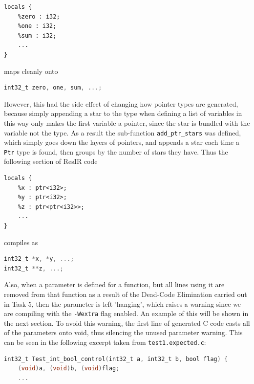 \documentclass[11pt, a4paper]{article}
\begin{document}
\begin{lstlisting}[morekeywords={locals, i32}]
locals {
    %zero : i32;
    %one : i32;
    %sum : i32;
    ...
}
\end{lstlisting}
maps cleanly onto 
\begin{lstlisting}[language=C, morekeywords={bool, int32_t, int64_t}]
int32_t zero, one, sum, ...;
\end{lstlisting}

\medskip

However, this had the side effect of changing how pointer types are generated, because simply appending a star to the type when defining a list of variables 
in this way only makes the first variable a pointer, since the star is bundled with the variable not the type. As a result the sub-function \texttt{add\_ptr\_stars}
was defined, which simply goes down the layers of pointers, and appends a star each time a \texttt{Ptr} type is found, then groups by the number of stars they have. 
Thus the following section of ResIR code

\begin{lstlisting}[morekeywords={locals, i32, ptr}]
locals {
    %x : ptr<i32>;
    %y : ptr<i32>;
    %z : ptr<ptr<i32>>;
    ...
}
\end{lstlisting}
compiles as 
\begin{lstlisting}[language=C, morekeywords={bool, int32_t, int64_t}]
int32_t *x, *y, ...;
int32_t **z, ...;
\end{lstlisting}

\medskip

Also, when a parameter is defined for a function, but all lines using it are removed from that function as a result of the Dead-Code Elimination carried out in Task 5,
then the parameter is left 'hanging', which raises a warning since we are compiling with the \texttt{-Wextra} flag enabled. An example of this will be shown in the next section. To avoid this warning, the first line of generated
C code casts all of the parameters onto void, thus silencing the unused parameter warning. This can be seen in the following excerpt taken from \texttt{test1.expected.c}:

\begin{lstlisting}[language=C, morekeywords={bool, int32_t, int64_t}]
int32_t Test_int_bool_control(int32_t a, int32_t b, bool flag) {
    (void)a, (void)b, (void)flag;
    ...
\end{lstlisting}

\medskip
\end{document}
